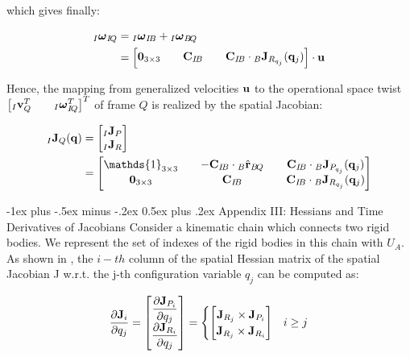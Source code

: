 \documentclass[10pt,landscape,a4paper]{article}
\makeatletter
\renewcommand{\section}{\@startsection{section}{1}{0mm}%
                               {-1ex plus -.5ex minus -.2ex}%
                                {0.5ex plus .2ex}%
                                {\normalfont\large\bfseries}}
\newcommand\identity{\mathds{1}}
\newcommand\poshat[3]{{}_#1\hat{\vr}_{#2\!#3}}
\newcommand\comat[2]{\vC_{#1\!#2}}
\newcommand\rotvel[3]{{}_#1\vom_{#2\!#3}}
\makeatother
\begin{document}
\begin{multicols}{2}
which gives finally:

\begin{equation}
\begin{aligned}
\rotvel{I}{I}{Q}
&= \rotvel{I}{I}{B} + \rotvel{I}{B}{Q} \\
&= 
\begin{bmatrix}
\mathbf{0}_{3 \times 3} && \comat{I}{B} && \comat{I}{B} \cdot {}_B \vJ_{R_{q_j}}(\vq_j)
\end{bmatrix}
\cdot \vu
\end{aligned}
\end{equation}

Hence, the mapping from generalized velocities $\mathbf u$ to the operational space twist $\begin{bmatrix}{}_I \vv_{Q}^T && \rotvel{I}{I}{Q}^T \end{bmatrix}^T$ of frame $Q$ is realized by the spatial Jacobian:

\begin{equation}
\begin{aligned}
{}_I \vJ_Q(\vq)
&=
\begin{bmatrix}
{}_I \vJ_P \\
{}_I \vJ_R
\end{bmatrix} \\
&=
\begin{bmatrix}
\identity_{3\times 3} && -\comat{I}{B} \cdot \poshat{B}{B}{Q} && \comat{I}{B} \cdot {}_B \vJ_{P_{q_j}}(\vq_j) \\
\mathbf{0}_{3 \times 3} && \comat{I}{B} && \comat{I}{B} \cdot {}_B \vJ_{R_{q_j}}(\vq_j)
\end{bmatrix}
\end{aligned}
\end{equation}

\section{Appendix III: Hessians and Time Derivatives of Jacobians}
Consider a kinematic chain which connects two rigid bodies. We represent the set of indexes of the rigid bodies in this chain with $U_A$. As shown in \cite{Iwamura2013}, the $i-th$ column of the spatial Hessian matrix of the spatial Jacobian J w.r.t. the j-th configuration variable $q_j$ can be computed as:

\begin{equation}
\dfrac{\partial \mathbf J_i}{\partial q_j}
= \begin{bmatrix}
\dfrac{\partial \mathbf J_{P_i}}{\partial q_j} \\ \dfrac{\partial \mathbf J_{R_i}}{\partial q_j}
\end{bmatrix}
=
\begin{cases}
\begin{bmatrix}
\mathbf J_{R_j} \times \mathbf J_{P_i}\\ 
\mathbf J_{R_j} \times \mathbf J_{R_i}
\end{bmatrix} & i \ge j \\


\end{cases}
\end{equation}
\end{multicols}
\end{document}
